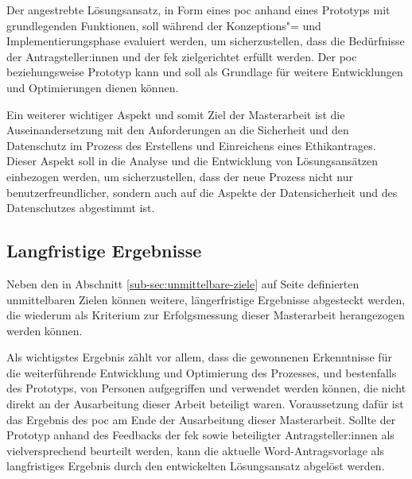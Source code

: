 \documentclass[a4paper,12pt,twoside]{scrreprt}
\begin{document}
Der angestrebte Lösungsansatz, in Form eines \ac{poc} anhand eines Prototyps mit grundlegenden Funktionen, soll während der Konzeptions"= und Implementierungsphase evaluiert werden, um sicherzustellen, dass die Bedürfnisse der Antragsteller:innen und der \acl{fek} zielgerichtet erfüllt werden. Der \ac{poc} beziehungsweise Prototyp kann und soll als Grundlage für weitere Entwicklungen und Optimierungen dienen können.

Ein weiterer wichtiger Aspekt und somit Ziel der Masterarbeit ist die Auseinandersetzung mit den Anforderungen an die Sicherheit und den Datenschutz im Prozess des Erstellens und Einreichens eines Ethikantrages. Dieser Aspekt soll in die Analyse und die Entwicklung von Lösungsansätzen einbezogen werden, um sicherzustellen, dass der neue Prozess nicht nur benutzerfreundlicher, sondern auch auf die Aspekte der Datensicherheit und des Datenschutzes abgestimmt ist.

\subsection{Langfristige Ergebnisse}
\label{sub-sec:langfristige-ergebnisse}

Neben den in Abschnitt \ref{sub-sec:unmittelbare-ziele} auf Seite \pageref{sub-sec:unmittelbare-ziele} definierten unmittelbaren Zielen können weitere, längerfristige Ergebnisse abgesteckt werden, die wiederum als Kriterium zur Erfolgsmessung dieser Masterarbeit herangezogen werden können.

Als wichtigstes Ergebnis zählt vor allem, dass die gewonnenen Erkenntnisse für die weiterführende Entwicklung und Optimierung des Prozesses, und bestenfalls des Prototyps, von Personen aufgegriffen und verwendet werden können, die nicht direkt an der Ausarbeitung dieser Arbeit beteiligt waren. Voraussetzung dafür ist das Ergebnis des \ac{poc} am Ende der Ausarbeitung dieser Masterarbeit. Sollte der Prototyp anhand des Feedbacks der \acl{fek} sowie beteiligter Antragsteller:innen als vielversprechend beurteilt werden, kann die aktuelle Word-Antragsvorlage als langfristiges Ergebnis durch den entwickelten Lösungsansatz abgelöst werden.

\medskip
\end{document}
